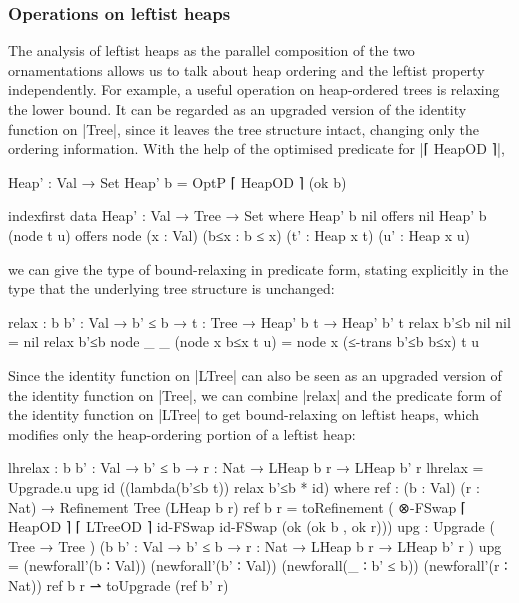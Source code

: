 \subsubsection{Operations on leftist heaps}

The analysis of leftist heaps as the parallel composition of the two ornamentations allows us to talk about heap ordering and the leftist property independently.
For example, a useful operation on heap-ordered trees is relaxing the lower bound.
It can be regarded as an upgraded version of the identity function on |Tree|, since it leaves the tree structure intact, changing only the ordering information.
With the help of the optimised predicate for |⌈ HeapOD ⌉|,
\begin{code}
Heap' : Val → Set
Heap' b = OptP ⌈ HeapOD ⌉ (ok b)

indexfirst data Heap' : Val → Tree → Set where
  Heap' b  nil         offers  nil
  Heap' b  (node t u)  offers  node  (x : Val) (b≤x : b ≤ x)
                                     (t' : Heap x t) (u' : Heap x u)
\end{code}
we can give the type of bound-relaxing in predicate form, stating explicitly in the type that the underlying tree structure is unchanged:
\begin{code}
relax : {b b' : Val} → b' ≤ b → {t : Tree} → Heap' b t → Heap' b' t
relax b'≤b {nil       }  nil               =  nil
relax b'≤b {node _ _  }  (node x b≤x t u)  =  node x (≤-trans b'≤b b≤x) t u
\end{code}
Since the identity function on |LTree| can also be seen as an upgraded version of the identity function on |Tree|, we can combine |relax| and the predicate form of the identity function on |LTree| to get bound-relaxing on leftist heaps, which modifies only the heap-ordering portion of a leftist heap:
\begin{code}
lhrelax : {b b' : Val} → b' ≤ b → {r : Nat} → LHeap b r → LHeap b' r
lhrelax = Upgrade.u upg id ((lambda(b'≤b t)) relax b'≤b * id)
  where
    ref : (b : Val) (r : Nat) → Refinement Tree (LHeap b r)
    ref b r =  toRefinement
                 (  ⊗-FSwap ⌈ HeapOD ⌉ ⌈ LTreeOD ⌉ id-FSwap id-FSwap
                      (ok (ok b , ok r)))
    upg :  Upgrade
             (                                     Tree       → Tree        )
             ({b b' : Val} → b' ≤ b → {r : Nat} →  LHeap b r  → LHeap b' r  )
    upg =   (newforall'(b ∶ Val)) (newforall'(b' ∶ Val)) (newforall(_ ∶ b' ≤ b))
              (newforall'(r ∶ Nat)) ref b r ⇀ toUpgrade (ref b' r)
\end{code}
